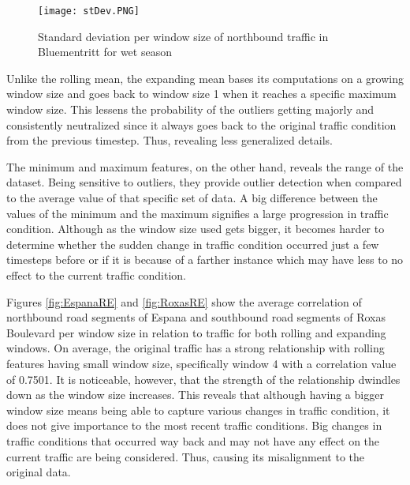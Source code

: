 \begin{figure}
  \centering
  \captionsetup{justification=centering}
  \texttt{[image: stDev.PNG]}
  \caption{Standard deviation per window size of northbound traffic in Bluementritt for wet season}
  \label{figure_stdev_traffic}
\end{figure}


Unlike the rolling mean, the expanding mean bases its computations on a growing window size and goes back to window size 1 when it reaches a specific maximum window size. This lessens the probability of the outliers getting majorly and consistently neutralized since it always goes back to the original traffic condition from the previous timestep. Thus, revealing less generalized details.

The minimum and maximum features, on the other hand, reveals the range of the dataset. Being sensitive to outliers, they provide outlier detection when compared to the average value of that specific set of data. A big difference between the values of the minimum and the maximum signifies a large progression in traffic condition. Although as the window size used gets bigger, it becomes harder to determine whether the sudden change in traffic condition occurred just a few timesteps before or if it is because of a farther instance which may have less to no effect to the current traffic condition. 

Figures \ref{fig:EspanaRE} and \ref{fig:RoxasRE} show the average correlation of northbound road segments of Espana and southbound road segments of Roxas Boulevard per window size in relation to traffic for both rolling and expanding windows. On average, the original traffic has a strong relationship with rolling features having small window size, specifically window 4 with a correlation value of 0.7501. It is noticeable, however, that the strength of the relationship dwindles down as the window size increases. This reveals that although having a bigger window size means being able to capture various changes in traffic condition, it does not give importance to the most recent traffic conditions. Big changes in traffic conditions that occurred way back and may not have any effect on the current traffic are being considered. Thus, causing its misalignment to the original data. 

